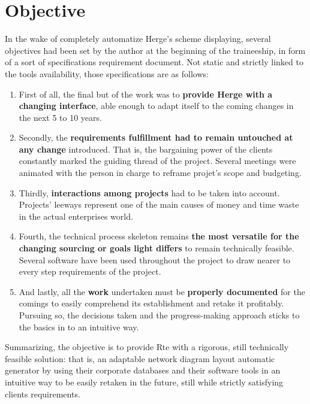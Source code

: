 \section{Objective}

In the wake of completely automatize Herge's scheme displaying, several objectives had been set by the author at the beginning of the traineeship, in form of a sort of specifications requirement document. Not static and strictly linked to the tools availability, those specifications are as follows:

\begin{enumerate}
	
	\item First of all, the final but of the work was to \textbf{provide Herge with a changing interface}, able enough to adapt itself to the coming changes in the next 5 to 10 years.
	
	\item Secondly, the \textbf{requirements fulfillment had to remain untouched at any change} introduced. That is, the bargaining power of the clients constantly marked the guiding thread of the project. Several meetings were animated with the person in charge to reframe projet's scope and budgeting.
	
	\item Thirdly, \textbf{interactions among projects} had to be taken into account. Projects' leeways represent one of the main causes of money and time waste in the actual enterprises world. 
	
	\item Fourth, the technical process skeleton remains \textbf{the most versatile for the changing sourcing or goals light differs} to remain technically feasible. Several software have been used throughout the project to draw nearer to every step requirements of the project.
	
	\item And lastly, all the \textbf{work} undertaken must be \textbf{properly documented} for the comings to easily comprehend its establishment and retake it profitably. Pursuing so, the decisions taken and the progress-making approach sticks to the basics in to an intuitive way.
	
\end{enumerate}

Summarizing, the objective is to provide Rte with a rigorous, still technically feasible solution: that is, an adaptable network diagram layout automatic generator by using their corporate databases and their software tools in an intuitive way to be easily retaken in the future, still while strictly satisfying clients requirements.


